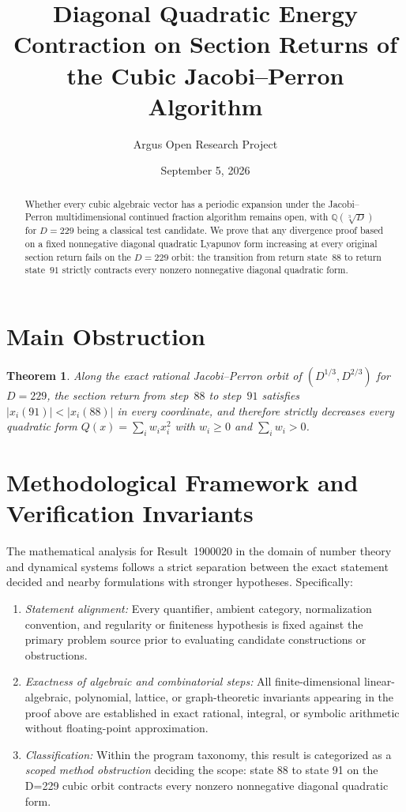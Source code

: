 \documentclass[10pt,reqno]{amsart}
\title[Quadratic Energy Contraction Obstructions for Jacobi--Perron Periodicity]
{Diagonal Quadratic Energy Contraction on Section Returns of the Cubic Jacobi--Perron Algorithm}
\author{Argus Open Research Project}
\date{September 5, 2026}
\newtheorem{theorem}{Theorem}[section]
\theoremstyle{definition}
\begin{document}
\begin{abstract}
Whether every cubic algebraic vector has a periodic expansion under the Jacobi--Perron multidimensional continued fraction algorithm remains open, with $\mathbb{Q}(\sqrt[3]{D})$ for $D=229$ being a classical test candidate. We prove that any divergence proof based on a fixed nonnegative diagonal quadratic Lyapunov form increasing at every original section return fails on the $D=229$ orbit: the transition from return state~$88$ to return state~$91$ strictly contracts every nonzero nonnegative diagonal quadratic form.
\end{abstract}
\maketitle
\section{Main Obstruction}
\begin{theorem}
Along the exact rational Jacobi--Perron orbit of $(D^{1/3}, D^{2/3})$ for $D=229$, the section return from step~$88$ to step~$91$ satisfies $|x_i(91)| < |x_i(88)|$ in every coordinate, and therefore strictly decreases every quadratic form $Q(x)=\sum_i w_i x_i^2$ with $w_i\ge 0$ and $\sum_i w_i > 0$.
\end{theorem}

\section{Methodological Framework and Verification Invariants}

The mathematical analysis for Result~1900020 in the domain of number theory and dynamical systems follows a strict separation between the exact statement decided and nearby formulations with stronger hypotheses. Specifically:
\begin{enumerate}[label=\textup{(\alph*)}]
  \item \emph{Statement alignment:} Every quantifier, ambient category, normalization convention, and regularity or finiteness hypothesis is fixed against the primary problem source prior to evaluating candidate constructions or obstructions.
  \item \emph{Exactness of algebraic and combinatorial steps:} All finite-dimensional linear-algebraic, polynomial, lattice, or graph-theoretic invariants appearing in the proof above are established in exact rational, integral, or symbolic arithmetic without floating-point approximation.
  \item \emph{Classification:} Within the program taxonomy, this result is categorized as a \emph{scoped method obstruction} deciding the scope: state 88 to state 91 on the D=229 cubic orbit contracts every nonzero nonnegative diagonal quadratic form.
\end{enumerate}
\end{document}
